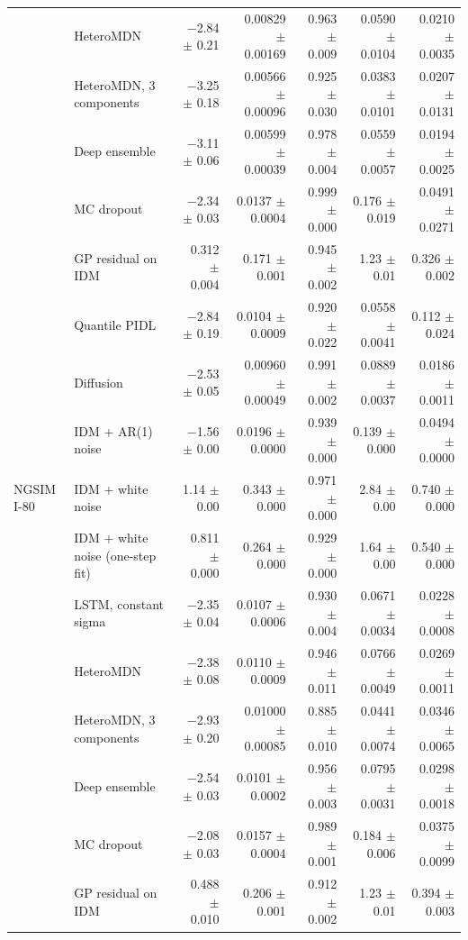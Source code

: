 \begin{longtable}{llrrrrr}
 & HeteroMDN & $-$2.84 $\pm$ 0.21 & 0.00829 $\pm$ 0.00169 & 0.963 $\pm$ 0.009 & 0.0590 $\pm$ 0.0104 & 0.0210 $\pm$ 0.0035 \\
 & HeteroMDN, 3 components & $-$3.25 $\pm$ 0.18 & 0.00566 $\pm$ 0.00096 & 0.925 $\pm$ 0.030 & 0.0383 $\pm$ 0.0101 & 0.0207 $\pm$ 0.0131 \\
 & Deep ensemble & $-$3.11 $\pm$ 0.06 & 0.00599 $\pm$ 0.00039 & 0.978 $\pm$ 0.004 & 0.0559 $\pm$ 0.0057 & 0.0194 $\pm$ 0.0025 \\
 & MC dropout & $-$2.34 $\pm$ 0.03 & 0.0137 $\pm$ 0.0004 & 0.999 $\pm$ 0.000 & 0.176 $\pm$ 0.019 & 0.0491 $\pm$ 0.0271 \\
 & GP residual on IDM & 0.312 $\pm$ 0.004 & 0.171 $\pm$ 0.001 & 0.945 $\pm$ 0.002 & 1.23 $\pm$ 0.01 & 0.326 $\pm$ 0.002 \\
 & Quantile PIDL & $-$2.84 $\pm$ 0.19 & 0.0104 $\pm$ 0.0009 & 0.920 $\pm$ 0.022 & 0.0558 $\pm$ 0.0041 & 0.112 $\pm$ 0.024 \\
 & Diffusion & $-$2.53 $\pm$ 0.05 & 0.00960 $\pm$ 0.00049 & 0.991 $\pm$ 0.002 & 0.0889 $\pm$ 0.0037 & 0.0186 $\pm$ 0.0011 \\
 & IDM + AR(1) noise & $-$1.56 $\pm$ 0.00 & 0.0196 $\pm$ 0.0000 & 0.939 $\pm$ 0.000 & 0.139 $\pm$ 0.000 & 0.0494 $\pm$ 0.0000 \\
\midrule
NGSIM I-80 & IDM + white noise & 1.14 $\pm$ 0.00 & 0.343 $\pm$ 0.000 & 0.971 $\pm$ 0.000 & 2.84 $\pm$ 0.00 & 0.740 $\pm$ 0.000 \\
 & IDM + white noise (one-step fit) & 0.811 $\pm$ 0.000 & 0.264 $\pm$ 0.000 & 0.929 $\pm$ 0.000 & 1.64 $\pm$ 0.00 & 0.540 $\pm$ 0.000 \\
 & LSTM, constant sigma & $-$2.35 $\pm$ 0.04 & 0.0107 $\pm$ 0.0006 & 0.930 $\pm$ 0.004 & 0.0671 $\pm$ 0.0034 & 0.0228 $\pm$ 0.0008 \\
 & HeteroMDN & $-$2.38 $\pm$ 0.08 & 0.0110 $\pm$ 0.0009 & 0.946 $\pm$ 0.011 & 0.0766 $\pm$ 0.0049 & 0.0269 $\pm$ 0.0011 \\
 & HeteroMDN, 3 components & $-$2.93 $\pm$ 0.20 & 0.01000 $\pm$ 0.00085 & 0.885 $\pm$ 0.010 & 0.0441 $\pm$ 0.0074 & 0.0346 $\pm$ 0.0065 \\
 & Deep ensemble & $-$2.54 $\pm$ 0.03 & 0.0101 $\pm$ 0.0002 & 0.956 $\pm$ 0.003 & 0.0795 $\pm$ 0.0031 & 0.0298 $\pm$ 0.0018 \\
 & MC dropout & $-$2.08 $\pm$ 0.03 & 0.0157 $\pm$ 0.0004 & 0.989 $\pm$ 0.001 & 0.184 $\pm$ 0.006 & 0.0375 $\pm$ 0.0099 \\
 & GP residual on IDM & 0.488 $\pm$ 0.010 & 0.206 $\pm$ 0.001 & 0.912 $\pm$ 0.002 & 1.23 $\pm$ 0.01 & 0.394 $\pm$ 0.003 \\

\end{longtable}
